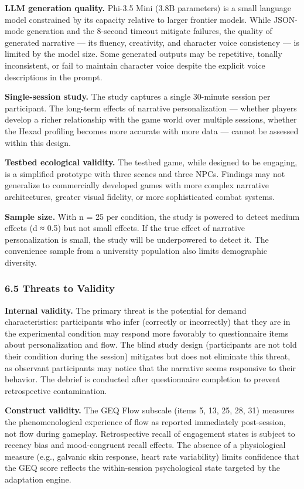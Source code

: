 \textbf{LLM generation quality.} Phi-3.5 Mini (3.8B parameters) is a
small language model constrained by its capacity relative to larger
frontier models. While JSON-mode generation and the 8-second timeout
mitigate failures, the quality of generated narrative --- its fluency,
creativity, and character voice consistency --- is limited by the model
size. Some generated outputs may be repetitive, tonally inconsistent, or
fail to maintain character voice despite the explicit voice descriptions
in the prompt.

\textbf{Single-session study.} The study captures a single 30-minute
session per participant. The long-term effects of narrative
personalization --- whether players develop a richer relationship with
the game world over multiple sessions, whether the Hexad profiling
becomes more accurate with more data --- cannot be assessed within this
design.

\textbf{Testbed ecological validity.} The testbed game, while designed
to be engaging, is a simplified prototype with three scenes and three
NPCs. Findings may not generalize to commercially developed games with
more complex narrative architectures, greater visual fidelity, or more
sophisticated combat systems.

\textbf{Sample size.} With n = 25 per condition, the study is powered to
detect medium effects (d ≈ 0.5) but not small effects. If the true
effect of narrative personalization is small, the study will be
underpowered to detect it. The convenience sample from a university
population also limits demographic diversity.

\subsubsection{6.5 Threats to Validity}\label{threats-to-validity}

\textbf{Internal validity.} The primary threat is the potential for
demand characteristics: participants who infer (correctly or
incorrectly) that they are in the experimental condition may respond
more favorably to questionnaire items about personalization and flow.
The blind study design (participants are not told their condition during
the session) mitigates but does not eliminate this threat, as observant
participants may notice that the narrative seems responsive to their
behavior. The debrief is conducted after questionnaire completion to
prevent retrospective contamination.

\textbf{Construct validity.} The GEQ Flow subscale (items 5, 13, 25, 28,
31) measures the phenomenological experience of flow as reported
immediately post-session, not flow during gameplay. Retrospective recall
of engagement states is subject to recency bias and mood-congruent
recall effects. The absence of a physiological measure (e.g., galvanic
skin response, heart rate variability) limits confidence that the GEQ
score reflects the within-session psychological state targeted by the
adaptation engine.

